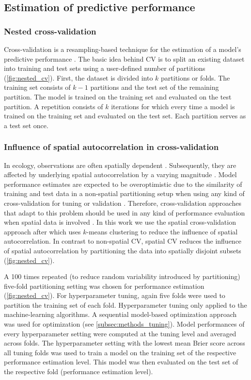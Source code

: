 \documentclass[review]{elsarticle}
\begin{document}
\subsection{Estimation of predictive performance}
\label{sec:nested_cv}

\subsubsection{Nested cross-validation}
\label{subsubsec:nested_cv}
Cross-validation is a resampling-based technique for the estimation of a model's predictive performance \citep{James2013}.
The basic idea behind \ac{CV} is to split an existing dataset into training and test sets using a user-defined number of partitions (\autoref{fig:nested_cv}).
First, the dataset is divided into $k$ partitions or folds.
The training set consists of $k - 1$ partitions and the test set of the remaining partition.
The model is trained on the training set and evaluated on the test partition.
A repetition consists of $k$ iterations for which every time a model is trained on the training set and evaluated on the test set.
Each partition serves as a test set once.

\subsubsection{Influence of spatial autocorrelation in cross-validation}
In ecology, observations are often spatially dependent \citep{Dormann2007, Legendre1989}.
Subsequently, they are affected by underlying spatial autocorrelation by a varying magnitude \citep{Legendre1993, Cliff1970, Telford2005}.
Model performance estimates are expected to be overoptimistic due to the similarity of training and test data in a non-spatial partitioning setup when using any kind of cross-validation for tuning or validation \citep{Burman1994, Cliff1970, Racine2000}.
Therefore, cross-validation approaches that adapt to this problem should be used in any kind of performance evaluation when spatial data is involved \citep{Meyer2018, Telford2009}.
In this work we use the spatial cross-validation approach after \cite{sperrorest} which uses $k$-means clustering to reduce the influence of spatial autocorrelation.
In contrast to non-spatial CV, spatial CV reduces the influence of spatial autocorrelation by partitioning the data into spatially disjoint subsets (\autoref{fig:nested_cv}).

A 100 times repeated (to reduce random variability introduced by partitioning) five-fold partitioning setting was chosen for performance estimation (\autoref{fig:nested_cv}).
For hyperparameter tuning, again five folds were used to partition the training set of each fold.
Hyperparameter tuning only applied to the machine-learning algorithms.
A sequential model-based optimization approach was used for optimization (see \autoref{subsec:methods_tuning}).
Model performances of every hyperparameter setting were computed at the tuning level and averaged across folds.
The hyperparameter setting with the lowest mean Brier score across all tuning folds was used to train a model on the training set of the respective performance estimation level.
This model was then evaluated on the test set of the respective fold (performance estimation level).
\end{document}
